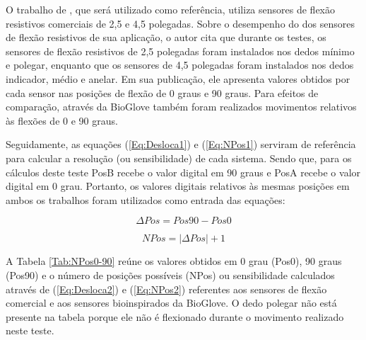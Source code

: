 \documentclass[
	12pt,				%
	openright,			%
	oneside,			%
	a4paper,			%
	english,			%
	brazil				%
	]{abntex2}
\begin{document}
	
		O trabalho de \cite{anbarasi2013deafmute}, que será utilizado como referência, utiliza sensores de flexão resistivos comerciais de 2,5 e 4,5 polegadas. Sobre o desempenho do dos sensores de flexão resistivos de sua aplicação, o autor cita que durante os testes, os sensores de flexão resistivos de 2,5 polegadas foram instalados nos dedos mínimo e polegar, enquanto que os sensores de 4,5 polegadas foram instalados nos dedos indicador, médio e anelar. Em sua publicação, ele apresenta valores obtidos por cada sensor nas posições de flexão de 0 graus e 90 graus. Para efeitos de comparação, através da BioGlove também foram realizados movimentos relativos às flexões de 0 e 90 graus. 
		
		Seguidamente, as equações (\ref{Eq:Desloca1}) e (\ref{Eq:NPos1}) serviram de referência para calcular a resolução (ou sensibilidade) de cada sistema. Sendo que, para os cálculos deste teste PosB recebe o valor digital em 90 graus e PosA recebe o valor digital em 0 grau. Portanto, os valores digitais relativos às mesmas posições em ambos os trabalhos foram utilizados como entrada das equações: 
		
	\begin{equation}
			\Delta Pos 	= Pos 90 	- 	Pos 0
		\label{Eq:Desloca2}
	\end{equation}


	\begin{equation}
			NPos = |\Delta Pos| + 1
		\label{Eq:NPos2}
	\end{equation}


		A Tabela \ref{Tab:NPos0-90} reúne os valores obtidos em 0 grau (Pos0), 90 graus (Pos90) e o número de posições possíveis (NPos) ou sensibilidade calculados através de (\ref{Eq:Desloca2}) e (\ref{Eq:NPos2}) referentes aos sensores de flexão comercial e aos sensores bioinspirados da BioGlove. O dedo polegar não está presente na tabela porque ele não é flexionado durante o movimento realizado neste teste.
		
\end{document}
